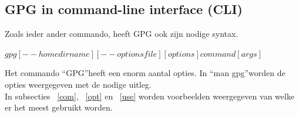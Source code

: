 \documentclass[12pt]{article}
\begin{document}
			\subsection{GPG in command-line interface (CLI)}\label{CLI}
				Zoals ieder ander commando, heeft GPG ook zijn nodige syntax.\\
				\begin{center}
					$gpg  [--homedir name]  [--options file]  [options]  command  [args]$\\
				\end{center}
				Het commando \textquotedblleft GPG\textquotedblright heeft een enorm aantal opties. In \textquotedblleft man gpg\textquotedblright worden de opties weergegeven met de nodige uitleg.\\
				In subsecties ~\ref{com}, ~\ref{opt} en ~\ref{use} worden voorbeelden weergegeven van welke er het meest gebruikt worden.\\
				
				\newpage
\end{document}
